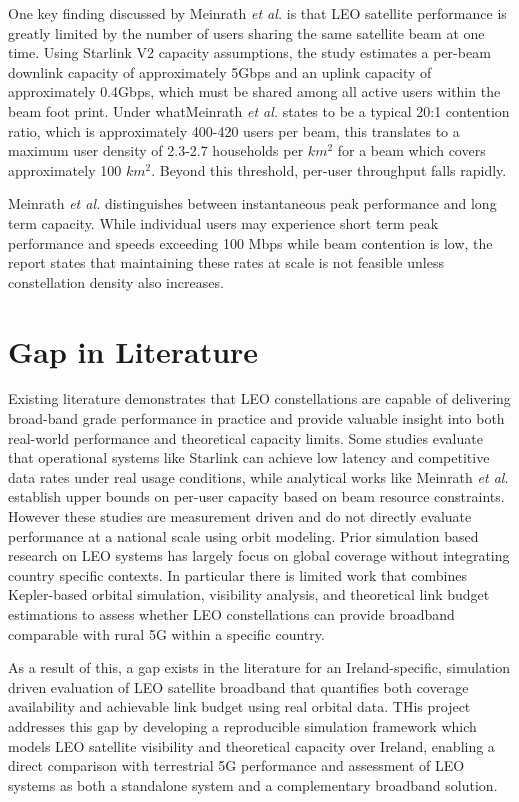 One key finding discussed by Meinrath \textit{et al.} \cite{XLabStarlink2025} is that LEO satellite performance is greatly limited by the number of users sharing the same satellite beam at one time. Using Starlink V2 capacity assumptions, the study estimates a per-beam downlink capacity of approximately 5Gbps and an uplink capacity of approximately 0.4Gbps, which must be shared among all active users within the beam foot print. Under whatMeinrath \textit{et al.} \cite{XLabStarlink2025} states to be a typical 20:1 contention ratio, which is approximately 400-420 users per beam, this translates to a maximum user density of 2.3-2.7 households per $km^2$ for a beam which covers approximately 100 $km^2$. Beyond this threshold, per-user throughput falls rapidly. 

Meinrath \textit{et al.} \cite{XLabStarlink2025} distinguishes between instantaneous peak performance and long term capacity. While individual users may experience short term peak performance and speeds exceeding 100 Mbps while beam contention is low, the report states that maintaining these rates at scale is not feasible unless constellation density also increases. 

\FloatBarrier
\section{Gap in Literature}
Existing literature demonstrates that LEO constellations are capable of delivering broad-band grade performance in practice and provide valuable insight into both real-world performance and theoretical capacity limits. Some studies evaluate that operational systems like Starlink can achieve low latency and competitive data rates under real usage conditions, while analytical works like Meinrath \textit{et al.} \cite{XLabStarlink2025} establish upper bounds on per-user capacity based on beam resource constraints. However these studies are measurement driven and do not directly evaluate performance at a national scale using orbit modeling. Prior simulation based research on LEO systems has largely focus on global coverage without integrating country specific contexts. In particular there is limited work that combines Kepler-based orbital simulation, visibility analysis, and theoretical link budget estimations to assess whether LEO constellations can provide broadband comparable with rural 5G within a specific country. 

As a result of this, a gap exists in the literature for an Ireland-specific, simulation driven evaluation of LEO satellite broadband that quantifies both coverage availability and achievable link budget using real orbital data. THis project addresses this gap by developing a reproducible simulation framework which models LEO satellite visibility and theoretical capacity over Ireland, enabling a direct comparison with terrestrial 5G performance and assessment of LEO systems as both a standalone system and a complementary broadband solution. 

